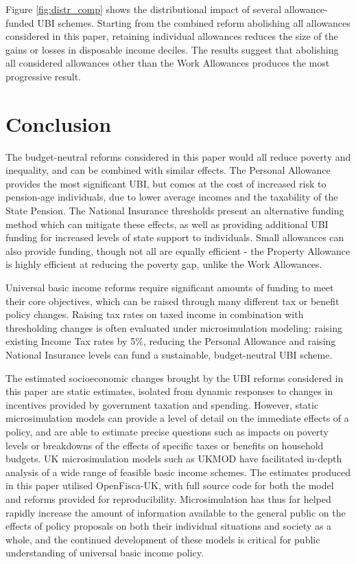 \documentclass{article}
\begin{document}
    Figure \ref{fig:distr_comp} shows the distributional impact of several allowance-funded UBI schemes. Starting from the combined reform abolishing all allowances considered in this paper, retaining individual allowances reduces the size of the gains or losses in disposable income deciles.  The results suggest that abolishing all considered allowances other than the Work Allowances produces the most progressive result.

    \section{Conclusion}
    The budget-neutral reforms considered in this paper would all reduce poverty and inequality, and can be combined with similar effects. The Personal Allowance provides the most significant UBI, but comes at the cost of increased risk to pension-age individuals, due to lower average incomes and the taxability of the State Pension. The National Insurance thresholds present an alternative funding method which can mitigate these effects, as well as providing additional UBI funding for increased levels of state support to individuals. Small allowances can also provide funding, though not all are equally efficient - the Property Allowance is highly efficient at reducing the poverty gap, unlike the Work Allowances.

    Universal basic income reforms require significant amounts of funding to meet their core objectives, which can be raised through many different tax or benefit policy changes. Raising tax rates on taxed income in combination with thresholding changes is often evaluated under microsimulation modeling: raising existing Income Tax rates by 5\%, reducing the Personal Allowance and raising National Insurance levels can fund a sustainable, budget-neutral UBI scheme\cite{recovery_UBI}.

    The estimated socioeconomic changes brought by the UBI reforms considered in this paper are static estimates, isolated from dynamic responses to changes in incentives provided by government taxation and spending. However, static microsimulation models can provide a level of detail on the immediate effects of a policy, and are able to estimate precise questions such as impacts on poverty levels or breakdowns of the effects of specific taxes or benefits on household budgets. UK microsimulation models such as UKMOD have facilitated in-depth analysis of a wide range of feasible basic income schemes\cite{feasible_UBI_2}\cite{feasible_UBI_1}. The estimates produced in this paper utilised OpenFisca-UK, with full source code for both the model and reforms provided for reproducibility. Microsimulation has thus far helped rapidly increase the amount of information available to the general public on the effects of policy proposals on both their individual situations and society as a whole, and the continued development of these models is critical for public understanding of universal basic income policy.

    
    
\end{document}
